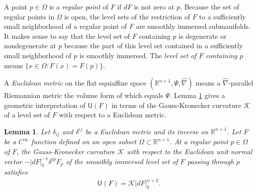 \documentclass [leqno, 10pt]{amsart}
\newtheorem{lemma}[theorem]{Lemma}
\theoremstyle{definition}
\numberwithin{equation}{section}
\newcommand{\gau}{\mathscr{K}}
\newcommand{\Om}{\Omega}
\newcommand{\U}{\mathsf{U}}
\newcommand{\cinf}{C^{\infty}}
\newcommand{\hnabla}{\widehat{\nabla}}
\newcommand{\rea}{\mathbb R}
\begin{document}
A point $p \in \Om$ is a \textit{regular point} of $F$ if $dF$ is not zero at $p$. Because the set of regular points in $\Om$ is open, the level sets of the restriction of $F$ to a sufficiently small neighborhood of a regular point of $F$ are smoothly immersed submanifolds. It makes sense to say that the level set of $F$ containing $p$ is degenerate or nondegenerate at $p$ because the part of this level set contained in a sufficiently small neighborhood of $p$ is smoothly immersed. The \textit{level set of $F$ containing $p$} means $\{x \in \Om: F(x) = F(p)\}$.

A \textit{Euclidean metric} on the flat equiaffine space $(\rea^{n+1}, \Psi, \hnabla)$ means a $\hnabla$-parallel Riemannian metric the volume form of which equals $\Psi$.
Lemma \ref{ufgausslemma} gives a geometric interpretation of $\U(F)$ in terms of the Gauss-Kronecker curvature $\gau$ of a level set of $F$ with respect to a Euclidean metric. 

\begin{lemma}\label{ufgausslemma}
Let $\delta_{ij}$  and $\delta^{ij}$ be a Euclidean metric and its inverse on $\rea^{n+1}$. 
Let $F$ be a $\cinf$ function defined on an open subset $\Om \subset \rea^{n+1}$. At a regular point $p \in \Om$ of $F$, the Gauss-Kronecker curvature $\gau$ with respect to the Euclidean unit normal vector $-|dF|_{\delta}^{-1}\delta^{ip}F_{p}$ of the smoothly immersed level set of $F$ passing through $p$ satisfies
\begin{align}\label{ufgauss}
\U(F) = \gau|dF|^{n+2}_{\delta}.
\end{align}
\end{lemma}
\end{document}
